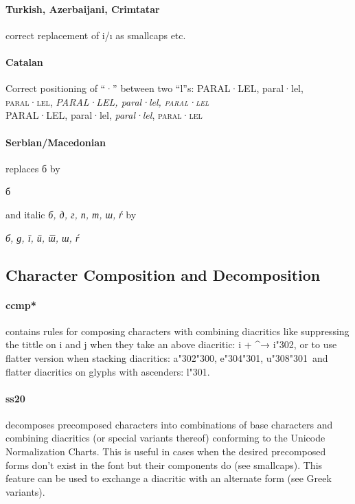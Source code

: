 \documentclass[pagesize,DIV14]{scrartcl}
\begin{document}
\paragraph*{Turkish, Azerbaijani, Crimtatar} correct replacement of i/ı as smallcaps etc.
\paragraph*{Catalan} Correct positioning of “·” between two “l”s: {PARAL·LEL, paral·lel, \textsc{paral·lel}, \textit{PARAL·LEL, paral·lel, \textsc{paral·lel}}\\{\scriptsize PARAL·LEL, paral·lel, \textit{paral·lel}, \textsc{paral·lel}}}
\paragraph*{Serbian/Macedonian} replaces б by \begin{serbian}б\end{serbian} and italic \textit{б, д, г, п, т, ш, ѓ} by \begin{serbian}\itshape б, д, г, п, т, ш, ѓ\end{serbian}

\subsection{Character Composition and Decomposition}
\paragraph*{ccmp*} contains rules for composing characters with combining diacritics like suppressing the tittle on i and j when they take an above diacritic: i + \textasciicircum → i\char"302, or to use flatter version when stacking diacritics: a\char"302\char"300, e\char"304\char"301, u\char"308\char"301\ and flatter diacritics on glyphs with ascenders: l\char"301.
\paragraph*{ss20} decomposes precomposed characters into combinations of base characters and combining diacritics (or special variants thereof) conforming to the Unicode Normalization Charts. This is useful in cases when the desired precomposed forms don’t exist in the font but their components do (see smallcaps). This feature can be used to exchange a diacritic with an alternate form (see Greek variants).
\end{document}
